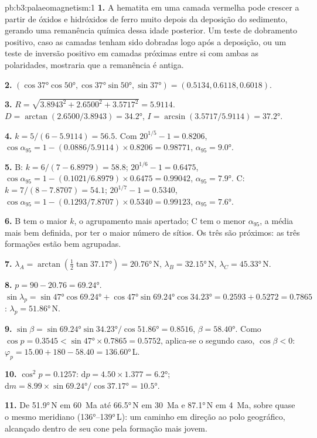 \begin{solution}{pb:b3:palaeomagnetism:1}
\textbf{1.} A hematita em uma camada vermelha pode crescer a partir de óxidos e hidróxidos de ferro
muito depois da deposição do sedimento, gerando uma remanência química dessa
idade posterior. Um teste de dobramento positivo, caso as camadas tenham sido dobradas logo após a
deposição, ou um teste de inversão positivo em camadas próximas entre si com ambas as
polaridades, mostraria que a remanência é antiga.

\textbf{2.} $(\cos\ang{37}\cos\ang{50}, \cos\ang{37}\sin\ang{50}, \sin\ang{37})
= (0.5134, 0.6118, 0.6018)$.

\textbf{3.} $R = \sqrt{3.8943^2 + 2.6500^2 + 3.5717^2} = 5.9114$. $D =
\arctan(2.6500/3.8943) = \ang{34.2}$, $I = \arcsin(3.5717/5.9114) = \ang{37.2}$.

\textbf{4.} $k = 5/(6 - 5.9114) = 56.5$. Com $20^{1/5} - 1 = 0.8206$,
$\cos\alpha_{95} = 1 - (0.0886/5.9114)\times0.8206 = 0.98771$, $\alpha_{95} =
\ang{9.0}$.

\textbf{5.} B: $k = 6/(7 - 6.8979) = 58.8$; $20^{1/6} - 1 = 0.6475$,
$\cos\alpha_{95} = 1 - (0.1021/6.8979)\times0.6475 = 0.99042$, $\alpha_{95} =
\ang{7.9}$. C: $k = 7/(8 - 7.8707) = 54.1$; $20^{1/7} - 1 = 0.5340$,
$\cos\alpha_{95} = 1 - (0.1293/7.8707)\times0.5340 = 0.99123$, $\alpha_{95} =
\ang{7.6}$.

\textbf{6.} B tem o maior $k$, o agrupamento mais apertado; C tem o menor
$\alpha_{95}$, a média mais bem definida, por ter o maior número de sítios. Os três
são próximos: as três formações estão bem agrupadas.

\textbf{7.} $\lambda_A = \arctan(\tfrac12\tan\ang{37.17}) = \ang{20.76}$\,N,
$\lambda_B = \ang{32.15}$\,N, $\lambda_C = \ang{45.33}$\,N.

\textbf{8.} $p = 90 - 20.76 = \ang{69.24}$. $\sin\lambda_p =
\sin\ang{47}\cos\ang{69.24} + \cos\ang{47}\sin\ang{69.24}\cos\ang{34.23} =
0.2593 + 0.5272 = 0.7865$: $\lambda_p = \ang{51.86}$\,N.

\textbf{9.} $\sin\beta = \sin\ang{69.24}\sin\ang{34.23}/\cos\ang{51.86} =
0.8516$, $\beta = \ang{58.40}$. Como $\cos p = 0.3545 < \sin\ang{47}\times
0.7865 = 0.5752$, aplica-se o segundo caso, $\cos\beta < 0$:
$\varphi_p = 15.00 + 180 - 58.40 = \ang{136.60}$\,L.

\textbf{10.} $\cos^2p = 0.1257$: $\mathrm dp = 4.50\times1.377 = \ang{6.2}$;
$\mathrm dm = 8.99\times\sin\ang{69.24}/\cos\ang{37.17} = \ang{10.5}$.

\textbf{11.} De \ang{51.9}\,N em \qty{60}{Ma} até \ang{66.5}\,N em
\qty{30}{Ma} e \ang{87.1}\,N em \qty{4}{Ma}, sobre quase o mesmo meridiano
(\ang{136}--\ang{139}\,L): um caminho em direção ao polo geográfico, alcançado dentro
de seu cone pela formação mais jovem.


\end{solution}
